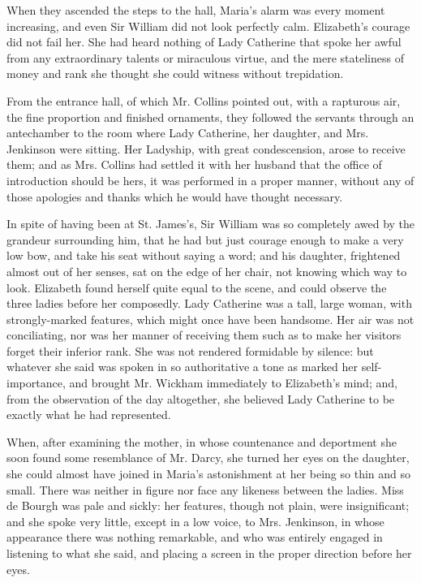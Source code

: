 \documentclass[10pt]{book}
\begin{document}
   When they ascended the steps to the hall, Maria’s alarm was every moment
increasing, and even Sir William did not look perfectly calm.
Elizabeth’s courage did not fail her. She had heard nothing of Lady
Catherine that spoke her awful from any extraordinary talents or
miraculous virtue, and the mere stateliness of money and rank she
thought she could witness without trepidation.
  

   From the entrance hall, of which Mr. Collins pointed out, with a
rapturous air, the fine proportion and finished ornaments, they followed
the servants through an antechamber to the room where Lady Catherine,
her daughter, and Mrs. Jenkinson were sitting. Her Ladyship, with great
condescension, arose to receive them; and as Mrs. Collins had settled it
with her husband that the office of introduction should be hers, it was
performed in a proper manner, without any of those apologies and thanks
which he would have thought necessary.
  

   In spite of having been at St. James’s, Sir William was so completely
awed by the grandeur surrounding him, that he had but just courage
enough to make a very
   low bow, and take his seat without saying a word;
and his daughter, frightened almost out of her senses, sat on the edge
of her chair, not knowing which way to look. Elizabeth found herself
quite equal to the scene, and could observe the three ladies before her
composedly. Lady Catherine was a tall, large woman, with strongly-marked
features, which might once have been handsome. Her air was not
conciliating, nor was her manner of receiving them such as to make her
visitors forget their inferior rank. She was not rendered formidable by
silence: but whatever she said was spoken in so authoritative a tone as
marked her self-importance, and brought Mr. Wickham immediately to
Elizabeth’s mind; and, from the observation of the day altogether, she
believed Lady Catherine to be exactly what he had represented.
  

   When, after examining the mother, in whose countenance and deportment
she soon found some resemblance of Mr. Darcy, she turned her eyes on the
daughter, she could almost have joined in Maria’s astonishment at her
being so thin and so small. There was neither in figure nor face any
likeness between the ladies. Miss de Bourgh was pale and sickly: her
features, though not plain, were insignificant; and she spoke very
little, except in a low voice, to Mrs. Jenkinson, in whose appearance
there was nothing remarkable, and who was entirely engaged in listening
to what she said, and placing a screen in the proper direction before
her eyes.
  
\end{document}
